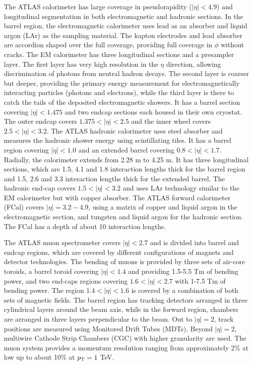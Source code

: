 %
The ATLAS calorimeter has large coverage in pseudorapidity ($|\eta|<4.9$)
and longitudinal segmentation in both electromagnetic and hadronic
sections.
In the barrel region, the electromagnetic calorimeter uses lead as an absorber
and liquid argon (LAr) as the sampling material.
The kapton electrodes and lead absorber are accordion shaped over the full
coverage, providing full coverage in $\phi$ without cracks.
The EM calorimeter has three longitudinal sections and a presampler layer.
The first layer has very high resolution
in the $\eta$ direction, allowing discrimination of photons from
neutral hadron decays.
The second layer is coarser but deeper, providing the primary energy
measurement for electromagnetically interacting particles (photons and
electrons), while the third layer is there to catch the tails of the
deposited electromagnetic showers.
It has a barrel section covering $|\eta|<1.475$ and two endcap sections
each housed in their own cryostat.  The outer endcap covers $1.375<|\eta|<2.5$
and the inner wheel covers $2.5<|\eta|<3.2$.
%
The ATLAS hadronic calorimeter uses steel absorber and measures the
hadronic shower energy using scintillating tiles.
It has a barrel region covering $|\eta|<1.0$ and an extended barrel
covering $0.8 < |\eta|< 1.7$.
Radially, the calorimeter extends from 2.28 m to 4.25 m.  It
has three longitudinal sections, which are 1.5, 4.1 and 1.8 interaction
lengths thick for the barrel region and 1.5, 2.6 and 3.3 interaction
lengths thick for the extended barrel.
%
The hadronic end-cap covers $1.5 < |\eta|< 3.2$ and uses LAr technology
similar to the EM calorimeter but with copper absorber.
%
The ATLAS forward calorimeter (FCal) covers $|\eta|=3.2-4.9$, using
a matrix of copper and liquid argon in the electromagnetic section,
and tungsten and liquid argon for the hadronic section.
The FCal has a depth of about 10 interaction lengths.
%

The ATLAS muon spectrometer covers $|\eta|<2.7$ and is divided into
barrel and endcap regions, which are covered by different configurations
of magnets and detector technologies.
The bending of muons is provided by three sets of air-core toroids,
a barrel toroid covering $|\eta|<1.4$ and providing 1.5-5.5 Tm of bending power,
and two end-caps regions covering $1.6 < |\eta| < 2.7$ with 1-7.5 Tm of
bending power.  The region $1.4 < |\eta| <1.6$ is covered by
a combination of both sets of magnetic fields.
The barrel region has tracking detectors arranged in three cylindrical
layers around the beam axis, while in the forward region, chambers are
arranged in three layers perpendicular to the beam.
Out to $|\eta|=2$, track positions are measured using Monitored Drift Tubes (MDTs).
Beyond $|\eta|=2$, multiwire Cathode Strip Chambers (CGC) with higher granularity
are used.
The muon system provides a momentum resolution ranging from approximately 2\% at
low \pT up to about 10\% at $\mbox{$p_{\mathrm{T}}$}=1$ TeV.
%

